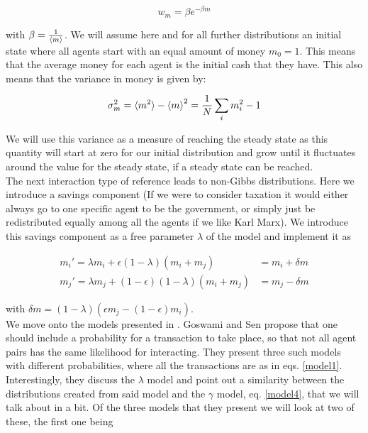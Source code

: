 \documentclass[a4paper,11pt]{article}
\begin{document}
{\begin{equation}
w_m = \beta e^{-\beta m}
\label{gibbsDistribution}
\end{equation}

with $\beta = \frac{1}{\braket{m}}$. We will assume here and for all further distributions an initial state where all agents start with an equal amount of money $m_0= 1$. This means that the average money for each agent is the initial cash that they have. This also means that the variance in money is given by:

\begin{equation}
\sigma_m^2 = \braket{m^2} - \braket{m}^2 = \frac{1}{N} \sum_i m_i^2 - 1
\label{variance}
\end{equation} 

We will use this variance as a measure of reaching the steady state as this quantity will start at zero for our initial distribution and grow until it fluctuates around the value for the steady state, if a steady state can be reached. \\

The next interaction type of reference \cite{GibbsVsnon-Gibbs} leads to non-Gibbs distributions. Here we introduce a savings component (If we were to consider taxation it would either always go to one specific agent to be the government, or simply just be redistributed equally among all the agents if we like Karl Marx). We introduce this savings component as a free parameter $\lambda$ of the model and implement it as

\begin{align}
m_i' = \lambda m_i + \epsilon(1 - \lambda) (m_i + m_j) &= m_i + \delta m\\
m_j' = \lambda m_j + (1 - \epsilon)(1 - \lambda) (m_i + m_j) &= m_j - \delta m
\label{model2}
\end{align}

with $\delta m = (1-\lambda)(\epsilon m_j - (1 - \epsilon)m_i)$. \\

We move onto the models presented in \cite{AgentBasedModels}. Goswami and Sen propose that one should include a probability for a transaction to take place, so that not all agent pairs has the same likelihood for interacting. They present three such models with different probabilities, where all the transactions are as in eqs. \ref{model1}. Interestingly, they discuss the $\lambda$ model and point out a similarity between the distributions created from said model and the $\gamma$ model, eq. \ref{model4}, that we will talk about in a bit. Of the three models that they present we will look at two of these, the first one being

}
\end{document}

